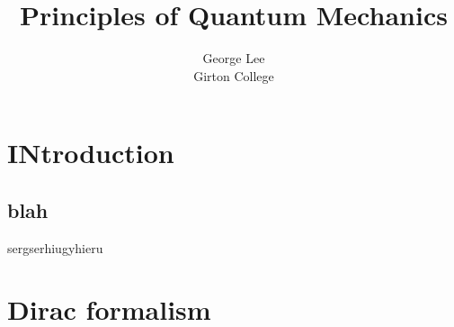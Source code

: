 \documentclass{article}
\title{Principles of Quantum Mechanics}
\author{George Lee\\Girton College}
\begin{document}
\maketitle
\section{INtroduction}
\subsection{blah}
sergserhiugyhieru
\section{Dirac formalism}
\end{document}

